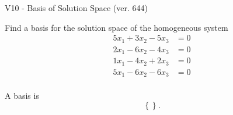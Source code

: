 \begin{exercise}
  \begin{exerciseTitle}V10 - Basis of Solution Space (ver. 644)\end{exerciseTitle}
  \begin{exerciseStatement}
    Find a basis for the solution space of the homogeneous system 
\begin{align*}
 5 x_ 1 + 3 x_ 2 -5 x_ 3 &= 0  \\ 
  2 x_ 1 -6 x_ 2 -4 x_ 3 &= 0  \\ 
  1 x_ 1 -4 x_ 2 + 2 x_ 3 &= 0  \\ 
  5 x_ 1 -6 x_ 2 -6 x_ 3 &= 0  \\ 
 \end{align*}


 
  \end{exerciseStatement}

  \begin{exerciseAnswer}
   A basis is   
\[\left\{\right\}.\]

  


  \end{exerciseAnswer}
\end{exercise}